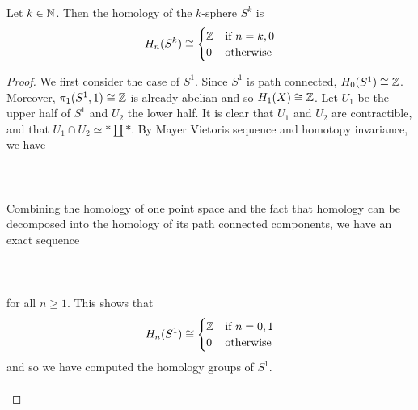 \documentclass[a4paper]{article}
\begin{document}
\begin{eg}{}{} Let $k\in\mathbb{N}$. Then the homology of the $k$-sphere $S^k$ is $$H_n(S^k)\cong\begin{cases}
\mathbb{Z} & \text{if } n=k,0\\
0 & \text{otherwise}
\end{cases}$$ \tcbline
\begin{proof}
We first consider the case of $S^1$. Since $S^1$ is path connected, $H_0(S^1)\cong\mathbb{Z}$. Moreover, $\pi_1(S^1,1)\cong\mathbb{Z}$ is already abelian and so $H_1(X)\cong\mathbb{Z}$. Let $U_1$ be the upper half of $S^1$ and $U_2$ the lower half. It is clear that $U_1$ and $U_2$ are contractible, and that $U_1\cap U_2\simeq\ast\amalg\ast$. By Mayer Vietoris sequence and homotopy invariance, we have \\~\\
\\~\\
Combining the homology of one point space and the fact that homology can be decomposed into the homology of its path connected components, we have an exact sequence \\~\\
\\~\\
for all $n\geq 1$. This shows that $$H_n(S^1)\cong\begin{cases}
\mathbb{Z} & \text{if } n=0,1\\
0 & \text{otherwise}
\end{cases}$$ and so we have computed the homology groups of $S^1$. \\~\\


\end{proof}
\end{eg}
\end{document}
